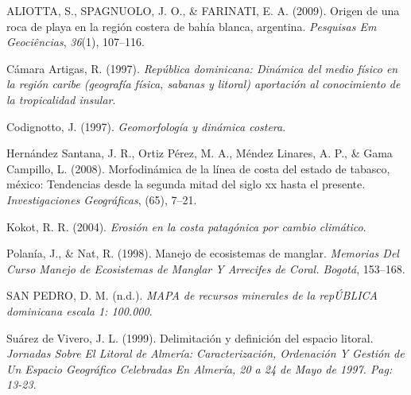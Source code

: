 \documentclass[11pt,]{article}
\begin{document}
\hypertarget{ref-aliotta2009origen}{}
ALIOTTA, S., SPAGNUOLO, J. O., \& FARINATI, E. A. (2009). Origen de una
roca de playa en la región costera de bahía blanca, argentina.
\emph{Pesquisas Em Geociências}, \emph{36}(1), 107--116.

\hypertarget{ref-camara1997republica}{}
Cámara Artigas, R. (1997). \emph{República dominicana: Dinámica del
medio físico en la región caribe (geografía física, sabanas y litoral)
aportación al conocimiento de la tropicalidad insular}.

\hypertarget{ref-codignotto1997geomorfologia}{}
Codignotto, J. (1997). \emph{Geomorfología y dinámica costera}.

\hypertarget{ref-hernandez2008morfodinamica}{}
Hernández Santana, J. R., Ortiz Pérez, M. A., Méndez Linares, A. P., \&
Gama Campillo, L. (2008). Morfodinámica de la línea de costa del estado
de tabasco, méxico: Tendencias desde la segunda mitad del siglo xx hasta
el presente. \emph{Investigaciones Geográficas}, (65), 7--21.

\hypertarget{ref-kokot2004erosion}{}
Kokot, R. R. (2004). \emph{Erosión en la costa patagónica por cambio
climático}.

\hypertarget{ref-polania1998manejo}{}
Polanía, J., \& Nat, R. (1998). Manejo de ecosistemas de manglar.
\emph{Memorias Del Curso Manejo de Ecosistemas de Manglar Y Arrecifes de
Coral. Bogotá}, 153--168.

\hypertarget{ref-sanmapa}{}
SAN PEDRO, D. M. (n.d.). \emph{MAPA de recursos minerales de la
repÚBLICA dominicana escala 1: 100.000}.

\hypertarget{ref-suarez1999delimitacion}{}
Suárez de Vivero, J. L. (1999). Delimitación y definición del espacio
litoral. \emph{Jornadas Sobre El Litoral de Almería: Caracterización,
Ordenación Y Gestión de Un Espacio Geográfico Celebradas En Almería, 20
a 24 de Mayo de 1997. Pag: 13-23}.




\newpage
\singlespacing 
\end{document}
